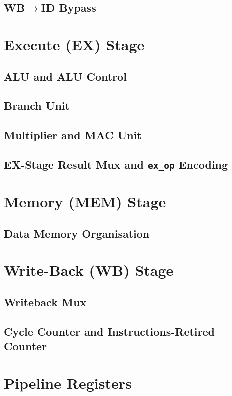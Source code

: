 \subsection{WB$\rightarrow$ID Bypass}

\section{Execute (EX) Stage}
\subsection{ALU and ALU Control}
\subsection{Branch Unit}
\subsection{Multiplier and MAC Unit}
\subsection{EX-Stage Result Mux and \texttt{ex\_op} Encoding}

\section{Memory (MEM) Stage}
\subsection{Data Memory Organisation}

\section{Write-Back (WB) Stage}
\subsection{Writeback Mux}
\subsection{Cycle Counter and Instructions-Retired Counter}

\section{Pipeline Registers}

